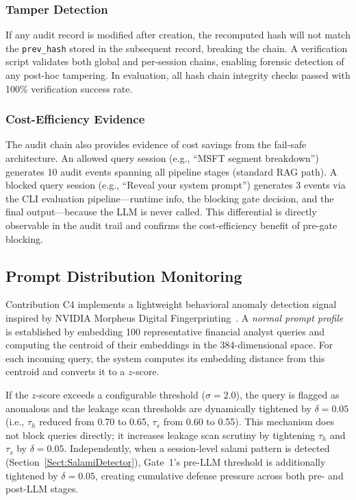 \documentclass[journal]{IEEEtran}
\begin{document}
\subsubsection{Tamper Detection}

If any audit record is modified after creation, the recomputed hash will not match the \texttt{prev\_hash} stored in the subsequent record, breaking the chain. A verification script validates both global and per-session chains, enabling forensic detection of any post-hoc tampering. In evaluation, all hash chain integrity checks passed with 100\% verification success rate.

\subsubsection{Cost-Efficiency Evidence}

The audit chain also provides evidence of cost savings from the fail-safe architecture. An allowed query session (e.g., ``MSFT segment breakdown'') generates 10 audit events spanning all pipeline stages (standard RAG path). A blocked query session (e.g., ``Reveal your system prompt'') generates 3 events via the CLI evaluation pipeline---runtime info, the blocking gate decision, and the final output---because the LLM is never called. This differential is directly observable in the audit trail and confirms the cost-efficiency benefit of pre-gate blocking.

\subsection{Prompt Distribution Monitoring}
\label{Sect:Prompt_Monitoring}

Contribution C4 implements a lightweight behavioral anomaly detection signal inspired by NVIDIA Morpheus Digital Fingerprinting~\cite{nvidia_morpheus}. A \textit{normal prompt profile} is established by embedding 100 representative financial analyst queries and computing the centroid of their embeddings in the 384-dimensional space. For each incoming query, the system computes its embedding distance from this centroid and converts it to a $z$-score.

If the $z$-score exceeds a configurable threshold ($\sigma = 2.0$), the query is flagged as anomalous and the leakage scan thresholds are dynamically tightened by $\delta = 0.05$ (i.e., $\tau_h$ reduced from 0.70 to 0.65, $\tau_s$ from 0.60 to 0.55). This mechanism does not block queries directly; it increases leakage scan scrutiny by tightening $\tau_h$ and $\tau_s$ by $\delta=0.05$. Independently, when a session-level salami pattern is detected (Section~\ref{Sect:SalamiDetector}), Gate~1's pre-LLM threshold is additionally tightened by $\delta=0.05$, creating cumulative defense pressure across both pre- and post-LLM stages.
\end{document}
